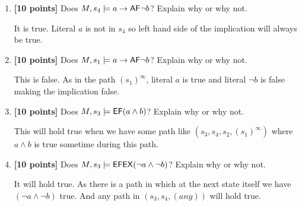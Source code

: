 \documentclass{article}
\begin{document}
\begin{enumerate}
Answer the following questions concerning the truth of statements
about the following transition model $M$.
\begin{center}
  \\
  {Model $M$}
\end{center}

\item \textbf{[10 points]} Does
  $M, s_4 \models a \rightarrow \mathord{\mathsf{A}} \mathord{\mathsf{F}} \neg b$?  Explain why or
  why not.
  \begin{answer}
  It is true. Literal $a$ is not in $s_4$ so left hand side of the implication will always be true.
  \end{answer}

\item \textbf{[10 points]} Does
  $M, s_1 \models a \rightarrow \mathord{\mathsf{A}} \mathord{\mathsf{F}} \neg b$?  Explain why or
  why not.
  \begin{answer}
  This is false. As in the path $(s_1)^\infty$, literal $a$ is true and literal $\neg b$ is false making the implication false.
  \end{answer}

\item \textbf{[10 points]} Does
  $M, s_3 \models \mathord{\mathsf{E}} \mathord{\mathsf{F}} (a \land b)$?  Explain why or why
  not.
  \begin{answer}
  This will hold true when we have some path like $(s_3,s_4,s_2,(s_1)^\infty)$ where $a \land b$ is true sometime during this path.
  \end{answer}

\item \textbf{[10 points]} Does
  $M, s_3 \models \mathord{\mathsf{E}} \mathord{\mathsf{F}} \mathord{\mathsf{E}} \mathord{\mathsf{X}} (\neg a \land \neg b)$?
  Explain why or why not.
  \begin{answer}
  It will hold true. As there is a path in which at the next state itself we have $ (\neg a \land \neg b)$ true. And any path in $(s_3,s_4, (any))$ will hold true.
  \end{answer}


\end{enumerate}
\end{document}
